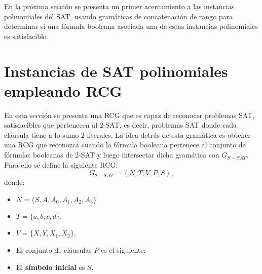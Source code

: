 \documentclass[12pt]{article}
\begin{document}
En la próxima sección se presenta un primer acercamiento a las instancias polinomiales del SAT, usando gramáticas de concatenación de rango
para determinar si una fórmula booleana asociada una de estas instancias polinomiales es satisfacible.

\section{Instancias de SAT polinomiales empleando RCG}

En esta sección se presenta una RCG que es capaz de reconocer problemas SAT, satisfacibles que pertenecen al 2-SAT, es decir, problemas SAT donde cada cláusula tiene a lo sumo 2 literales. La idea detrás de esta gramática es obtener una RCG que reconozca cuando la fórmula booleana pertenece al conjunto de fórmulas booleanas de 2-SAT y luego intersectar dicha gramática con $G_{S-SAT}$.  Para ello se define la siguiente RCG:
\[
    G_{2-SAT} = (N, T, V, P, S),
\]
donde:

\begin{itemize}
    \item $N=\{S,A,A_0,A_1,A_2,A_3\}$
    \item $T=\{a,b,c,d\}$.
    \item $V=\{X,Y,X_1,X_2\}$.
    \item El conjunto de cláusulas $P$ es el siguiente:
          \begin{enumerate}
          \end{enumerate}
    \item El \textbf{símbolo inicial} es $S$.
\end{itemize}
\end{document}

